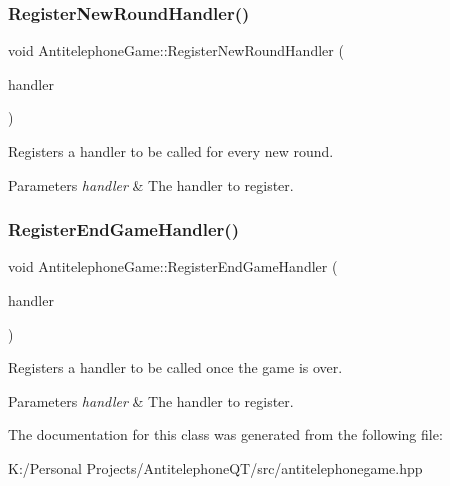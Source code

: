\subsubsection{\texorpdfstring{Register\+New\+Round\+Handler()}{RegisterNewRoundHandler()}}
{\footnotesize\ttfamily void Antitelephone\+Game\+::\+Register\+New\+Round\+Handler (\begin{DoxyParamCaption}\item[{std\+::function$<$ void(\hyperlink{classexternal_1_1_moment_overview}{Moment\+Overview})$>$}]{handler }\end{DoxyParamCaption})}



Registers a handler to be called for every new round. 


\begin{DoxyParams}{Parameters}
{\em handler} & The handler to register. \\
\hline
\end{DoxyParams}
\mbox{\label{class_antitelephone_game_ab02a45cc50f47680560b541f0d4aeef2}} 
\subsubsection{\texorpdfstring{Register\+End\+Game\+Handler()}{RegisterEndGameHandler()}}
{\footnotesize\ttfamily void Antitelephone\+Game\+::\+Register\+End\+Game\+Handler (\begin{DoxyParamCaption}\item[{std\+::function$<$ void()$>$}]{handler }\end{DoxyParamCaption})}



Registers a handler to be called once the game is over. 


\begin{DoxyParams}{Parameters}
{\em handler} & The handler to register. \\
\hline
\end{DoxyParams}


The documentation for this class was generated from the following file\+:\begin{DoxyCompactItemize}
\item 
K\+:/\+Personal Projects/\+Antitelephone\+Q\+T/src/antitelephonegame.\+hpp\end{DoxyCompactItemize}
